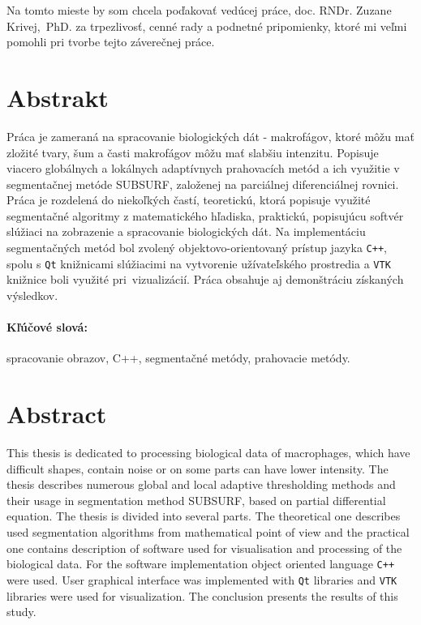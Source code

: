 \documentclass[a4paper,11pt,oneside]{article}%
\begin{document}
Na tomto mieste by som chcela poďakovať vedúcej práce, doc. RNDr. Zuzane Krivej,~PhD. za trpezlivosť, cenné rady a podnetné pripomienky, ktoré mi veľmi pomohli pri tvorbe tejto záverečnej práce.

\newpage 
 \thispagestyle{empty}
\section*{Abstrakt}

Práca je zameraná na spracovanie biologických dát - makrofágov, ktoré môžu mať zložité tvary, šum a časti makrofágov môžu mať slabšiu intenzitu. Popisuje viacero globálnych a lokálnych adaptívnych prahovacích metód a ich využitie v segmentačnej metóde SUBSURF, založenej na parciálnej diferenciálnej rovnici. Práca je rozdelená do niekoľkých častí, teoretickú, ktorá popisuje využité segmentačné algoritmy z matematického hľadiska, praktickú, popisujúcu softvér slúžiaci na zobrazenie a spracovanie biologických dát. Na implementáciu segmentačných metód bol zvolený objektovo-orientovaný prístup jazyka \texttt{C++}, spolu s \texttt{Qt} knižnicami slúžiacimi na vytvorenie užívateľského prostredia a \texttt{VTK} knižnice boli využité pri~vizualizácií. Práca obsahuje aj demonštráciu získaných výsledkov.


\paragraph*{Kľúčové slová:}spracovanie obrazov, C++, segmentačné metódy, prahovacie metódy.

\section*{Abstract}

This thesis is dedicated to processing biological data of macrophages, which have difficult shapes, contain noise or on some parts can have lower intensity. The thesis describes numerous global and local adaptive thresholding methods and their usage in segmentation method SUBSURF, based on partial differential equation. The thesis is divided into several parts. The theoretical one describes used segmentation algorithms from mathematical point of view and the practical one contains description of software used for visualisation and processing of the biological data. For the software implementation object oriented language \texttt{C++} were used. User graphical interface was implemented with \texttt{Qt} libraries and \texttt{VTK} libraries were used for visualization. The conclusion presents the results of this study.
\end{document}
